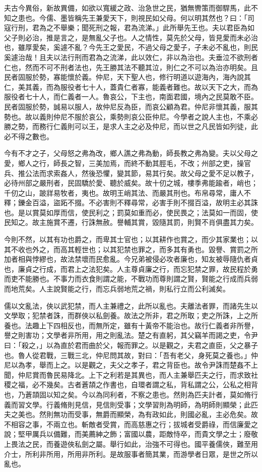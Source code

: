 \begin{pinyinscope}
夫古今異俗，新故異備，如欲以寬緩之政、治急世之民，猶無轡策而御駻馬，此不知之患也。今儒、墨皆稱先王兼愛天下，則視民如父母。何以明其然也？曰：「司寇行刑，君為之不舉樂；聞死刑之報，君為流涕。」此所舉先王也。夫以君臣為如父子則必治，推是言之，是無亂父子也。人之情性，莫先於父母，皆見愛而未必治也，雖厚愛矣，奚遽不亂？今先王之愛民，不過父母之愛子，子未必不亂也，則民奚遽治哉！且夫以法行刑而君為之流涕，此以效仁，非以為治也。夫垂泣不欲刑者仁也，然而不可不刑者法也，先王勝其法不聽其泣，則仁之不可以為治亦明矣。且民者固服於勢，寡能懷於義。仲尼，天下聖人也，修行明道以遊海內，海內說其仁，美其義，而為服役者七十人，蓋貴仁者寡，能義者難也。故以天下之大，而為服役者七十人，而仁義者一人。魯哀公，下主也，南面君國，境內之民莫敢不臣。民者固服於勢，誠易以服人，故仲尼反為臣，而哀公顧為君。仲尼非懷其義，服其勢也。故以義則仲尼不服於哀公，乘勢則哀公臣仲尼。今學者之說人主也，不乘必勝之勢，而務行仁義則可以王，是求人主之必及仲尼，而以世之凡民皆如列徒，此必不得之數也。

今有不才之子，父母怒之弗為改，鄉人譙之弗為動，師長教之弗為變。夫以父母之愛，鄉人之行，師長之智，三美加焉，而終不動其脛毛，不改；州部之吏，操官兵、推公法而求索姦人，然後恐懼，變其節，易其行矣。故父母之愛不足以教子，必待州部之嚴刑者，民固驕於愛、聽於威矣。故十仞之城，樓季弗能踰者，峭也；千仞之山，跛牂易牧者，夷也。故明王峭其法、而嚴其刑也。布帛尋常，庸人不釋；鑠金百溢，盜跖不掇。不必害則不釋尋常，必害手則不掇百溢，故明主必其誅也。是以賞莫如厚而信，使民利之；罰莫如重而必，使民畏之；法莫如一而固，使民知之。故主施賞不遷，行誅無赦。譽輔其賞，毀隨其罰，則賢不肖俱盡其力矣。

今則不然，以其有功也爵之，而卑其士官也；以其耕作也賞之，而少其家業也；以其不收也外之，而高其輕世也；以其犯禁也罪之，而多其有勇也。毀譽、賞罰之所加者相與悖繆也，故法禁壞而民愈亂。今兄弟被侵必攻者廉也，知友被辱隨仇者貞也，廉貞之行成，而君上之法犯矣。人主尊貞廉之行，而忘犯禁之罪，故民程於勇而吏不能勝也。不事力而衣食則謂之能，不戰功而尊則謂之賢，賢能之行成而兵弱而地荒矣。人主說賢能之行，而忘兵弱地荒之禍，則私行立而公利滅矣。

儒以文亂法，俠以武犯禁，而人主兼禮之，此所以亂也。夫離法者罪，而諸先生以文學取；犯禁者誅，而群俠以私劍養。故法之所非，君之所取；吏之所誅，上之所養也。法趣上下四相反也，而無所定，雖有十黃帝不能治也。故行仁義者非所譽，譽之則害功；文學者非所用，用之則亂法。楚之有直躬，其父竊羊而謁之吏，令尹曰：「殺之，」以為直於君而曲於父，報而罪之。以是觀之，夫君之直臣，父之暴子也。魯人從君戰，三戰三北，仲尼問其故，對曰：「吾有老父，身死莫之養也。」仲尼以為孝，舉而上之。以是觀之，夫父之孝子，君之背臣也。故令尹誅而楚姦不上聞，仲尼賞而魯民易降北。上下之利若是其異也，而人主兼舉匹夫之行，而求致社稷之福，必不幾矣。古者蒼頡之作書也，自環者謂之私，背私謂之公，公私之相背也，乃蒼頡固以知之矣。今以為同利者，不察之患也。然則為匹夫計者，莫如脩行義而習文學。行義脩則見信，見信則受事；文學習則為明師，為明師則顯榮；此匹夫之美也。然則無功而受事，無爵而顯榮，為有政如此，則國必亂，主必危矣。故不相容之事，不兩立也。斬敵者受賞，而高慈惠之行；拔城者受爵祿，而信廉愛之說；堅甲厲兵以備難，而美薦紳之飾；富國以農，距敵恃卒，而貴文學之士；廢敬上畏法之民，而養遊俠私劍之屬。舉行如此，治強不可得也。國平養儒俠，難至用介士，所利非所用，所用非所利。是故服事者簡其業，而游學者日眾，是世之所以亂也。


\end{pinyinscope}
